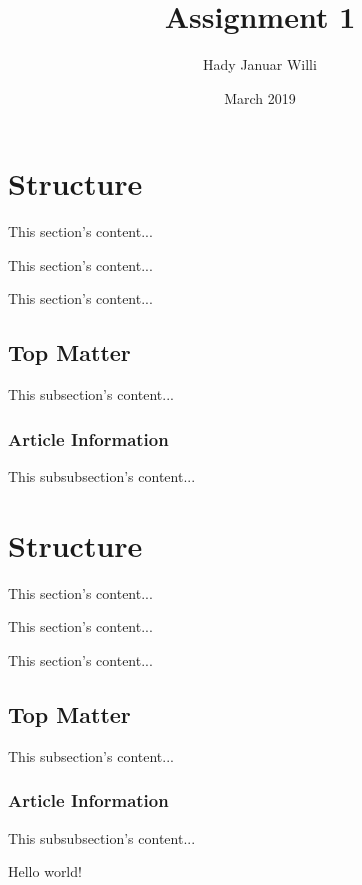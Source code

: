 \documentclass[11pt,a4paper,fleqn]{article}
\title{Assignment 1}
\author{Hady Januar Willi}
\date{March 2019}
\begin{document}
   \maketitle

   \section{Structure}
   This section's content...
   
\noindent This section's content...

   \noindent This section's content...

   \subsection{Top Matter}
   This subsection's content...

   \subsubsection{Article Information}
   This subsubsection's content...


   \section{Structure}

   This section's content...
   
\noindent
   This section's content...

   \noindent
   This section's content...

   \subsection{Top Matter}
   This subsection's content...

   \subsubsection{Article Information}
   This subsubsection's content...

      Hello world!
\end{document}
